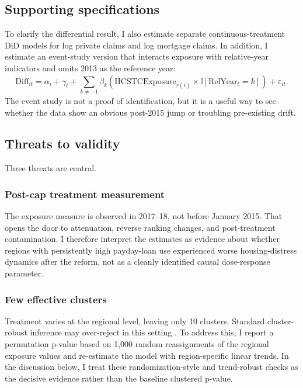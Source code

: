 \documentclass[12pt]{article}
\newcommand{\ind}{\mathbb{I}}
\begin{document}
\subsection{Supporting specifications}
To clarify the differential result, I also estimate separate continuous-treatment DiD models for log private claims and log mortgage claims. In addition, I estimate an event-study version that interacts exposure with relative-year indicators and omits 2013 as the reference year:
\begin{equation}
\text{Diff}_{it} = \alpha_i + \gamma_t + \sum_{k \neq -1} \beta_k \left( \text{HCSTCExposure}_{r(i)} \times \ind[\text{RelYear}_t = k] \right) + \varepsilon_{it}.
\end{equation}
The event study is not a proof of identification, but it is a useful way to see whether the data show an obvious post-2015 jump or troubling pre-existing drift.

\subsection{Threats to validity}
Three threats are central.

\subsubsection*{Post-cap treatment measurement}
The exposure measure is observed in 2017--18, not before January 2015. That opens the door to attenuation, reverse ranking changes, and post-treatment contamination. I therefore interpret the estimates as evidence about whether regions with persistently high payday-loan use experienced worse housing-distress dynamics after the reform, not as a cleanly identified causal dose-response parameter.

\subsubsection*{Few effective clusters}
Treatment varies at the regional level, leaving only 10 clusters. Standard cluster-robust inference may over-reject in this setting \citep{conley2011inference, cameron2008bootstrap, mackinnon2022cluster}. To address this, I report a permutation p-value based on 1,000 random reassignments of the regional exposure values and re-estimate the model with region-specific linear trends. In the discussion below, I treat these randomization-style and trend-robust checks as the decisive evidence rather than the baseline clustered p-value.
\end{document}
